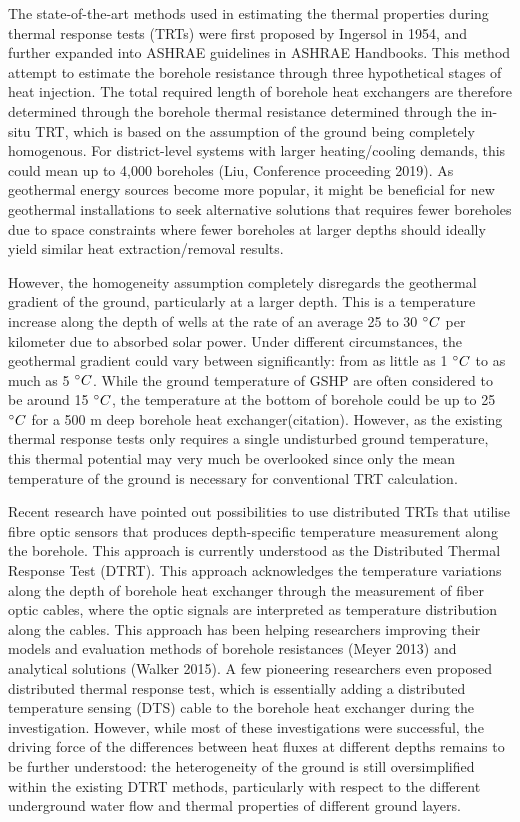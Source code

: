 The state-of-the-art methods used in estimating the thermal properties during thermal response tests (TRTs) were first proposed by Ingersol in 1954, and further expanded into ASHRAE guidelines in ASHRAE Handbooks. This method attempt to estimate the borehole resistance through three hypothetical stages of heat injection. The total required length of borehole heat exchangers are therefore determined through the borehole thermal resistance determined through the in-situ TRT, which is based on the assumption of the ground being completely homogenous. For district-level systems with larger heating/cooling demands, this could mean up to 4,000 boreholes (Liu, Conference proceeding 2019). As geothermal energy sources become more popular, it might be beneficial for new geothermal installations to seek alternative solutions that requires fewer boreholes due to space constraints where fewer boreholes at larger depths should ideally yield similar heat extraction/removal results.

However, the homogeneity assumption completely disregards the geothermal gradient of the ground, particularly at a larger depth. This is a temperature increase along the depth of wells at the rate of an average 25 to 30 $\degree C$ per kilometer due to absorbed solar power. Under different circumstances, the geothermal gradient could vary between significantly: from as little as 1 $\degree C$ to as much as 5 $\degree C$. While the ground temperature of GSHP are often considered to be around 15 $\degree C$, the temperature at the bottom of borehole could be up to 25 $\degree C$ for a 500 m deep borehole heat exchanger(citation). However, as the existing thermal response tests only requires a single undisturbed ground temperature, this thermal potential may very much be overlooked since only the mean temperature of the ground is necessary for conventional TRT calculation. 

Recent research have pointed out possibilities to use distributed TRTs that utilise fibre optic sensors that produces depth-specific temperature measurement along the borehole. This approach is currently understood as the  Distributed Thermal Response Test (DTRT). This approach acknowledges the temperature variations along the depth of borehole heat exchanger through the measurement of fiber optic cables, where the optic signals are interpreted as temperature distribution along the cables. This approach has been helping researchers improving their models and evaluation methods of borehole resistances (Meyer 2013) and analytical solutions (Walker 2015). A few pioneering researchers even proposed distributed thermal response test, which is essentially adding a distributed temperature sensing (DTS) cable to the borehole heat exchanger during the investigation. However, while most of these investigations were successful, the driving force of the differences between heat fluxes at different depths remains to be further understood: the heterogeneity of the ground is still oversimplified within the existing DTRT methods, particularly with respect to the different underground water flow and thermal properties of different ground layers. 

